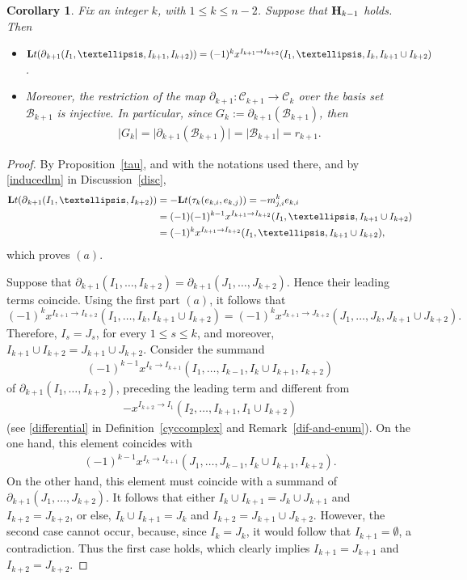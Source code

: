 \documentclass[10pt]{amsart}
\newcommand{\lt}{\mbox{${\bf L}{\rm t}$}}
\newcommand{\mcb}{\mbox{$\mathcal{B}$}}
\newcommand{\mcc}{\mbox{$\mathcal{C}$}}
\newcommand{\mbfh}{\mbox{${\bf H}$}}
\newcommand{\dif}{\mbox{$\partial$}}
\newtheorem{corollary}[cdrthm]{Corollary}
\theoremstyle{definition}
\theoremstyle{remark}
\begin{document}
\begin{corollary}\label{ltbij}
Fix an integer $k$, with $1\leq k\leq n-2$. Suppose that $\mbfh_{k-1}$
holds. Then 
\begin{itemize}
\item[$(a)$]
  $\lt(\dif_{k+1}(I_1,\ldots,I_{k+1},I_{k+2}))=(-1)^{k}x^{I_{k+1}\to
  I_{k+2}}(I_1,\ldots, I_{k},I_{k+1}\cup I_{k+2})$.
\item[$(b)$] Moreover, the restriction of the map
  $\dif_{k+1}:\mcc_{k+1}\to\mcc_{k}$ over the basis set $\mcb_{k+1}$
  is injective. In particular, since $G_k:=\dif_{k+1}(\mcb_{k+1})$,
  then 
\begin{eqnarray*}
\lvert
G_k\rvert=\lvert\dif_{k+1}(\mcb_{k+1})\rvert=
\lvert\mcb_{k+1}\rvert=r_{k+1}.
\end{eqnarray*}
\end{itemize}
\end{corollary}
\begin{proof}
By Proposition~\ref{tau}, and with the notations used there, and by
\eqref{inducedlm} in Discussion~\ref{disc},
\begin{align*}
\lt(\dif_{k+1}(I_1,\ldots,I_{k+2}))&=-\lt(\tau_{k}(e_{k,i},e_{k,j}))
=-m^{k}_{j,i}e_{k,i}
\\ &= (-1)(-1)^{k-1}x^{I_{k+1}\to I_{k+2}}(I_1,\ldots,
I_{k+1}\cup I_{k+2})\\
&= (-1)^{k}x^{I_{k+1}\to I_{k+2}}(I_1,\ldots,
I_{k+1}\cup I_{k+2}),
\end{align*}
which proves $(a)$.

Suppose that $\dif_{k+1}(I_1,\ldots ,I_{k+2})=\dif_{k+1}(J_1,\ldots
,J_{k+2})$. Hence their leading terms coincide. Using the first part
$(a)$, it follows that
\[
 (-1)^{k}x^{I_{k+1}\to I_{k+2}}(I_1,\ldots,I_{k},I_{k+1}\cup
  I_{k+2})\!=\! (-1)^{k}x^{J_{k+1}\to
    J_{k+2}}(J_1,\ldots,J_{k},J_{k+1}\cup J_{k+2}).
\]
Therefore, $I_s=J_s$, for every $1\leq s\leq k$, and moreover,
$I_{k+1}\cup I_{k+2}=J_{k+1}\cup J_{k+2}$. Consider the summand
\begin{eqnarray*}
(-1)^{k-1}x^{I_{k}\to I_{k+1}}(I_1,\ldots ,I_{k-1},I_{k}\cup
  I_{k+1},I_{k+2})
\end{eqnarray*} 
of $\dif_{k+1}(I_1,\ldots ,I_{k+2})$, preceding the leading term and
different from 
\begin{eqnarray*}
-x^{I_{k+2}\to I_1}(I_2,\ldots ,I_{k+1},I_1\cup I_{k+2})
\end{eqnarray*}
(see \eqref{differential} in Definition~\ref{cyccomplex} and
Remark~\ref{dif-and-enum}). On the one hand, this element coincides
with
\begin{eqnarray*}
(-1)^{k-1}x^{I_{k}\to I_{k+1}}(J_1,\ldots ,J_{k-1},I_{k}\cup
  I_{k+1},I_{k+2}). 
\end{eqnarray*}
On the other hand, this element must coincide with a summand of
$\dif_{k+1}(J_1,\ldots ,J_{k+2})$. It follows that either $I_{k}\cup
I_{k+1}=J_{k}\cup J_{k+1}$ and $I_{k+2}=J_{k+2}$, or else, $I_{k}\cup
I_{k+1}=J_{k}$ and $I_{k+2}=J_{k+1}\cup J_{k+2}$. However, the second
case cannot occur, because, since $I_{k}=J_{k}$, it would follow that
$I_{k+1}=\emptyset$, a contradiction. Thus the first case holds, which
clearly implies $I_{k+1}=J_{k+1}$ and $I_{k+2}=J_{k+2}$.
\end{proof}
\end{document}
